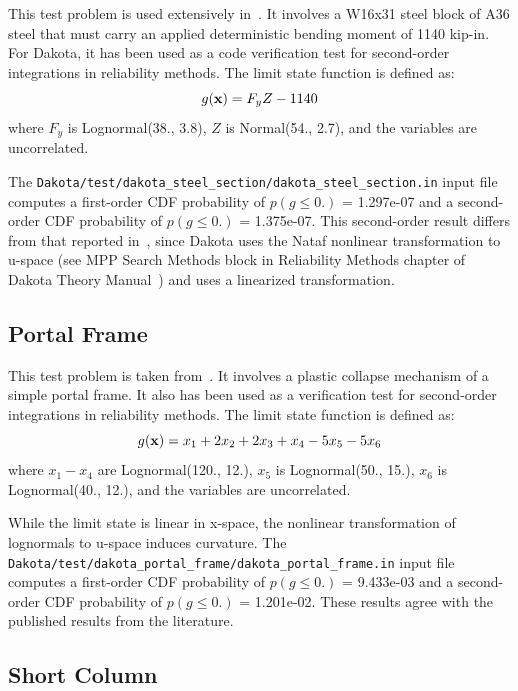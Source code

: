 This test problem is used extensively in~\cite{Hal00}. It involves a
W16x31 steel block of A36 steel that must carry an applied
deterministic bending moment of 1140 kip-in. For Dakota, it has been
used as a code verification test for second-order integrations in
reliability methods. The limit state function is defined as:
\begin{equation}
g({\bf x}) = F_y Z - 1140
\end{equation}
where $F_y$ is Lognormal(38., 3.8), $Z$ is Normal(54., 2.7), and the
variables are uncorrelated.

The \texttt{Dakota/test/dakota\_steel\_section/dakota\_steel\_section.in} input file computes
a first-order CDF probability of $p(g \leq 0.)$ = 1.297e-07 and a
second-order CDF probability of $p(g \leq 0.)$ = 1.375e-07. This
second-order result differs from that reported in~\cite{Hal00}, since
Dakota uses the Nataf nonlinear transformation to u-space (see MPP
Search Methods block in Reliability Methods chapter of Dakota Theory
Manual~\cite{TheoMan}) and \cite{Hal00} uses a linearized
transformation.

\subsection{Portal Frame}\label{additional:portal_frame}


This test problem is taken from~\cite{Tve90,Hon99}. It involves a
plastic collapse mechanism of a simple portal frame. It also has been
used as a verification test for second-order integrations in 
reliability methods. The limit state function is defined as:
\begin{equation}
g({\bf x}) = x_1 + 2 x_2 + 2 x_3 + x_4 - 5 x_5 - 5 x_6
\end{equation}
where $x_1 - x_4$ are Lognormal(120., 12.), $x_5$ is Lognormal(50.,
15.), $x_6$ is Lognormal(40., 12.), and the variables are uncorrelated.

While the limit state is linear in x-space, the nonlinear
transformation of lognormals to u-space induces curvature. The
\texttt{Dakota/test/dakota\_portal\_frame/dakota\_portal\_frame.in} input file computes a
first-order CDF probability of $p(g \leq 0.)$ = 9.433e-03 and a
second-order CDF probability of $p(g \leq 0.)$ = 1.201e-02. These
results agree with the published results from the literature.

\subsection{Short Column}\label{additional:short_column}

